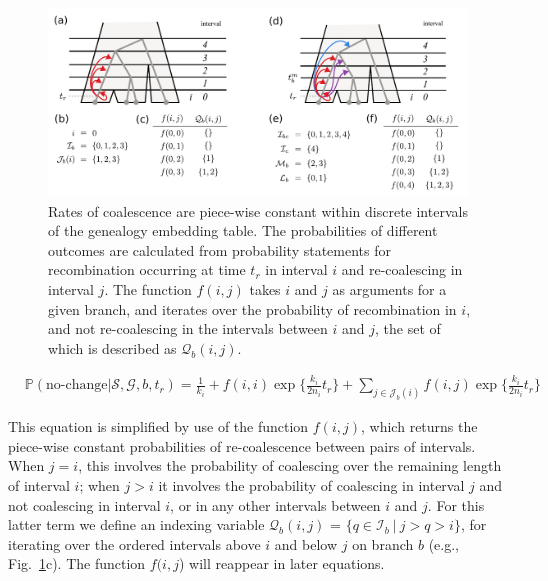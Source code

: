 \documentclass[11pt]{article}
\begin{document}
\begin{figure}[t]
	\centering
	\includegraphics[width=0.99\textwidth]{figures/interval-functions}
	\caption{
		Rates of coalescence are piece-wise constant within discrete intervals 
		of the genealogy embedding table. The probabilities of different outcomes
		are calculated from probability statements for recombination occurring
		at time $t_r$ in interval $i$ and re-coalescing in interval $j$. The 
		function $f(i,j)$ takes $i$ and $j$ as arguments for a given branch, 
		and iterates over the probability of recombination in $i$, and not
		re-coalescing in the intervals between $i$ and $j$, the set of which is described
		as $\mathcal{Q}_b(i,j)$. 
	}
	\label{fig:fig3}
\end{figure}


\begin{equation}
\begin{aligned}
	&\mathbb{P}(\text{no-change} | \mathcal{S},\mathcal{G},b,t_r) = 
	\frac{1}{k_i} + 
	f(i,i) \exp \bigg\{ \frac{k_i}{2n_i} t_r \bigg\} +
	\sum_{j \in \mathcal{J}_b(i)} f(i,j) \exp \bigg\{ \frac{k_i}{2n_i} t_r\bigg\}
\end{aligned}
\end{equation}


\noindent This equation is simplified by use of the function $f(i,j)$, which 
returns the piece-wise constant probabilities of re-coalescence between
pairs of intervals. When $j=i$, this involves the probability of 
coalescing over the remaining length of interval $i$; 
when $j>i$ it involves the probability of coalescing in interval 
$j$ and not coalescing in interval $i$, or in any other intervals 
between $i$ and $j$. 
For this latter term we define an indexing variable 
$\mathcal{Q}_b(i,j)$ = $\{q \in \mathcal{I}_b ~|~ j > q > i\}$, 
for iterating over the ordered intervals above $i$ and below $j$ 
on branch $b$ (e.g., Fig.~\ref{fig:fig3}c).
The function $f(i,j$) will reappear in later equations.
\end{document}
